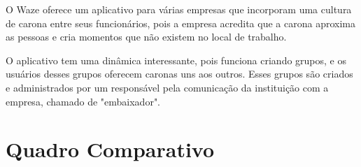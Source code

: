 O Waze oferece um aplicativo para várias empresas que incorporam uma cultura de carona entre seus funcionários, pois a empresa acredita que a carona aproxima as pessoas e cria momentos que não existem no local de trabalho.

O aplicativo tem uma dinâmica interessante, pois funciona criando grupos, e os usuários desses grupos oferecem caronas uns aos outros. %
Esses grupos são criados e administrados por um responsável pela comunicação da instituição com a empresa, chamado de "embaixador".


\section{Quadro Comparativo}


\begin{table}[]
	\centering
	\caption{Trabalhos Relacionados}
	\label{tab:quadro-comparativo}

\end{table}